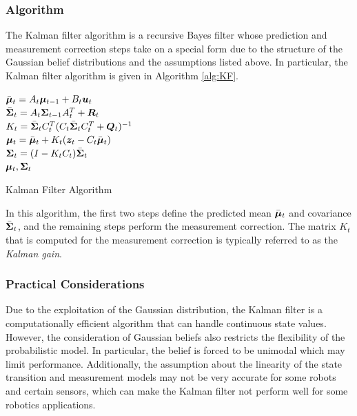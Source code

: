 \subsubsection{Algorithm}
The Kalman filter algorithm is a recursive Bayes filter whose prediction and measurement correction steps take on a special form due to the structure of the Gaussian belief distributions and the assumptions listed above.
In particular, the Kalman filter algorithm is given in Algorithm \ref{alg:KF}.

\begin{algorithm}[ht]
 $\bar{\bm{\mu}}_t = A_t\bm{\mu}_{t-1}+B_t \bm{u}_t$\\
 $\bar{\bm{\Sigma}}_t = A_t\bm{\Sigma}_{t-1} A_t^{T} + \bm{R}_t$\\
 $K_t = \bar{\bm{\Sigma}}_{t}C_t^{T}(C_t\bar{\bm{\Sigma}}_{t}C_t^{T}+\bm{Q}_t)^{-1}$\\
 $\bm{\mu}_t = \bar{\bm{\mu}}_t + K_t(\bm{z}_t-C_t\bar{\bm{\mu}}_{t})$\\
 $\bm{\Sigma}_t = (I-K_tC_t )\bar{\bm{\Sigma}}_t$\\
 \Return $\bm{\mu}_t, \bm{\Sigma}_t$
 \caption{Kalman Filter Algorithm}
 \label{alg:KF}
\end{algorithm}
In this algorithm, the first two steps define the predicted mean $\bar{\bm{\mu}}_t$ and covariance $\bar{\bm{\Sigma}}_t$, and the remaining steps perform the measurement correction. The matrix $K_t$ that is computed for the measurement correction is typically referred to as the \textit{Kalman gain}.

\subsubsection{Practical Considerations}
Due to the exploitation of the Gaussian distribution, the Kalman filter is a computationally efficient algorithm that can handle continuous state values. However, the consideration of Gaussian beliefs also restricts the flexibility of the probabilistic model. In particular, the belief is forced to be unimodal which may limit performance. Additionally, the assumption about the linearity of the state transition and measurement models may not be very accurate for some robots and certain sensors, which can make the Kalman filter not perform well for some robotics applications. 


